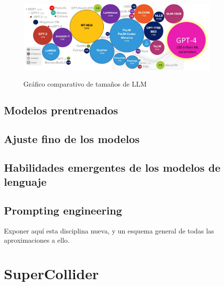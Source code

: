 \begin{figure}[]
    \caption{Gráfico comparativo de tamaños de LLM}
    \centering
    \includegraphics[width=0.9\textwidth]{./figuras/LLMs_sizes.png}
    \label{fig:llm_sizes}
\end{figure}

\subsection{Modelos prentrenados}
\subsection{Ajuste fino de los modelos}
\subsection{Habilidades emergentes de los modelos de lenguaje}
\subsection{Prompting engineering}
Exponer aquí esta disciplina nueva, y un esquema general de todas las aproximaciones a ello. \citep{LLMPromptingGuide}

\section{SuperCollider}

